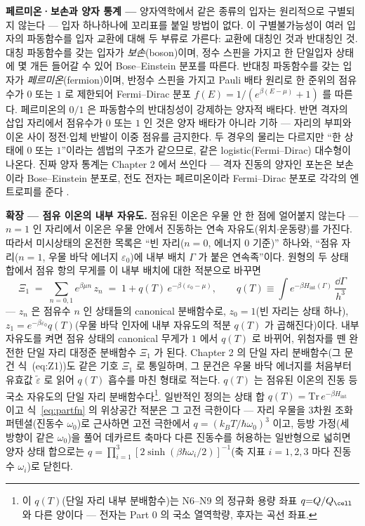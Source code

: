 \begin{bgbox}
\textbf{페르미온·보손과 양자 통계 ---} 양자역학에서 같은 종류의 입자는 원리적으로 구별되지 않는다 ---
입자 하나하나에 꼬리표를 붙일 방법이 없다. 이 구별불가능성이 여러 입자의 파동함수를 입자 교환에 대해 두
부류로 가른다: 교환에 대칭인 것과 반대칭인 것. 대칭 파동함수를 갖는 입자가 \emph{보손}(boson)이며, 정수
스핀을 가지고 한 단일입자 상태에 몇 개든 들어갈 수 있어 Bose--Einstein 분포를 따른다. 반대칭 파동함수를
갖는 입자가 \emph{페르미온}(fermion)이며, 반정수 스핀을 가지고 Pauli 배타 원리로 한 준위의 점유수가
$0$ 또는 $1$ 로 제한되어 Fermi--Dirac 분포 $f(E)=1/(e^{\beta(E-\mu)}+1)$ 를 따른다. 페르미온의 $0/1$ 은
파동함수의 반대칭성이 강제하는 양자적 배타다. 반면 격자의 삽입 자리에서 점유수가 $0$ 또는 $1$ 인 것은 양자
배타가 아니라 기하 --- 자리의 부피와 이온 사이 정전$\cdot$입체 반발이 이중 점유를 금지한다. 두 경우의 물리는
다르지만 ``한 상태에 $0$ 또는 $1$''이라는 셈법의 구조가 같으므로, 같은 logistic(Fermi--Dirac) 대수형이
나온다. 진짜 양자 통계는 Chapter 2 에서 쓰인다 --- 격자 진동의 양자인 포논은 보손이라 Bose--Einstein
분포로, 전도 전자는 페르미온이라 Fermi--Dirac 분포로 각각의 엔트로피를 준다
\cite{mcquarrie1976,ashcroftmermin1976}.
\end{bgbox}

\textbf{확장 --- 점유 이온의 내부 자유도.} 점유된 이온은 우물 안 한 점에 얼어붙지 않는다 --- $n=1$ 인
자리에서 이온은 우물 안에서 진동하는 연속 자유도(위치$\cdot$운동량)를 가진다. 따라서 미시상태의 온전한
목록은 ``빈 자리($n=0$, 에너지 $0$ 기준)'' 하나와, ``점유 자리($n=1$, 우물 바닥 에너지 $\varepsilon_0$)에
내부 배치 $\Gamma$ 가 붙은 연속족''이다. 원형의 두 상태 합에서 점유 항의 무게를 이 내부 배치에 대한
적분으로 바꾸면
\begin{equation}
\Xi_1\;=\;\sum_{n=0,1}e^{\beta\mu n}\,z_n
\;=\;1+q(T)\,e^{-\beta(\varepsilon_0-\mu)},
\qquad
q(T)\equiv\int e^{-\beta H_\mathrm{int}(\Gamma)}\,\frac{\dd\Gamma}{h^3}
\label{eq:partfn}
\end{equation}
--- $z_n$ 은 점유수 $n$ 인 상태들의 canonical 분배함수로, $z_0=1$(빈 자리는 상태 하나),
$z_1=e^{-\beta\varepsilon_0}q(T)$(우물 바닥 인자에 내부 자유도의 적분 $q(T)$ 가 곱해진다)이다. 내부
자유도를 켜면 점유 상태의 canonical 무게가 $1$ 에서 $q(T)$ 로 바뀌어, 위첨자를 뗀 완전한 단일 자리
대정준 분배함수 $\Xi_1$ 가 된다. Chapter 2 의 단일 자리 분배함수(그 문건 식~(eq:Z1))도 같은 기호 $\Xi_1$
로 통일하며, 그 문건은 우물 바닥 에너지를 처음부터 유효값 $\tilde\varepsilon$ 로 읽어 $q(T)$ 흡수를 마친
형태로 적는다. $q(T)$ 는 점유된 이온의 진동 등 국소 자유도의 단일 자리 분배함수다\footnote{이
$q(T)$(단일 자리 내부 분배함수)는 N6--N9 의 정규화 용량 좌표 $q{=}Q/Q_\cell$ 와 다른 양이다 --- 전자는
Part 0 의 국소 열역학량, 후자는 곡선 좌표.}. 일반적인 정의는 상태 합
$q(T)=\mathrm{Tr}\,e^{-\beta H_\mathrm{int}}$ 이고 식~\eqref{eq:partfn} 의 위상공간 적분은 그 고전
극한이다 --- 자리 우물을 3차원 조화 퍼텐셜(진동수 $\omega_0$)로 근사하면 고전 극한에서
$q=(k_BT/\hbar\omega_0)^3$ 이고, 등방 가정(세 방향이 같은 $\omega_0$)을 풀어 데카르트 축마다 다른
진동수를 허용하는 일반형으로 넓히면 양자 상태 합으로는
$q=\prod_{i=1}^{3}[2\sinh(\beta\hbar\omega_i/2)]^{-1}$(축 지표 $i=1,2,3$ 마다 진동수 $\omega_i$)로 닫힌다.

